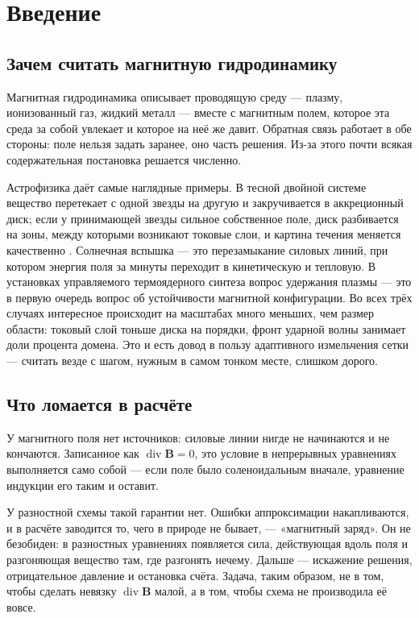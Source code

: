 \documentclass[12pt,a4paper]{article}
\newcommand{\divg}{\operatorname{div}}
\newcommand{\B}{\mathbf{B}}
\begin{document}
\tableofcontents
\newpage

\section{Введение}

\subsection{Зачем считать магнитную гидродинамику}

Магнитная гидродинамика описывает проводящую среду — плазму, ионизованный газ,
жидкий металл — вместе с магнитным полем, которое эта среда за собой увлекает и
которое на неё же давит. Обратная связь работает в обе стороны: поле нельзя
задать заранее, оно часть решения. Из-за этого почти всякая содержательная
постановка решается численно.

Астрофизика даёт самые наглядные примеры. В тесной двойной системе вещество
перетекает с одной звезды на другую и закручивается в аккреционный диск; если у
принимающей звезды сильное собственное поле, диск разбивается на зоны, между
которыми возникают токовые слои, и картина течения меняется качественно
\cite{zhilkin2010,zhilkin2012}. Солнечная вспышка — это перезамыкание силовых
линий, при котором энергия поля за минуты переходит в кинетическую и тепловую.
В установках управляемого термоядерного синтеза вопрос удержания плазмы —
это в первую очередь вопрос об устойчивости магнитной конфигурации. Во всех
трёх случаях интересное происходит на масштабах много меньших, чем размер
области: токовый слой тоньше диска на порядки, фронт ударной волны занимает
доли процента домена. Это и есть довод в пользу адаптивного измельчения сетки —
считать везде с шагом, нужным в самом тонком месте, слишком дорого.

\subsection{Что ломается в расчёте}
\label{sec:intro-div}

У магнитного поля нет источников: силовые линии нигде не начинаются и не
кончаются. Записанное как $\divg\B=0$, это условие в непрерывных уравнениях
выполняется само собой — если поле было соленоидальным вначале, уравнение
индукции его таким и оставит.

У разностной схемы такой гарантии нет. Ошибки аппроксимации накапливаются, и в
расчёте заводится то, чего в природе не бывает, — «магнитный заряд». Он не
безобиден: в разностных уравнениях появляется сила, действующая вдоль поля и
разгоняющая вещество там, где разгонять нечему. Дальше — искажение решения,
отрицательное давление и остановка счёта. Задача, таким образом, не в том, чтобы
сделать невязку $\divg\B$ малой, а в том, чтобы схема не производила её вовсе.
\end{document}
